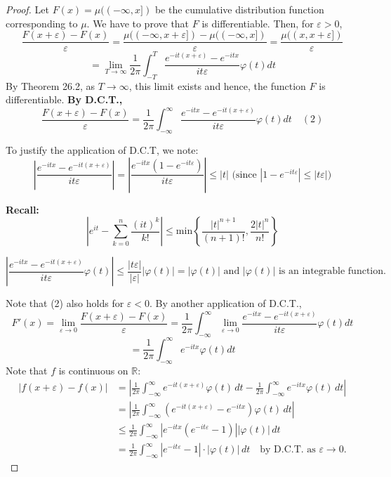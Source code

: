\begin{proof}
Let \( F(x) = \mu((-\infty, x]) \) be the cumulative distribution function corresponding to \(\mu\). We have to prove that \( F \) is differentiable. Then, for \( \varepsilon > 0 \),
\[
\frac{F(x+\varepsilon) - F(x)}{\varepsilon} = \frac{\mu((-\infty, x+\varepsilon]) - \mu((-\infty, x])}{\varepsilon} = \frac{\mu((x, x+\varepsilon])}{\varepsilon}
\]
\[
= \lim_{T \to \infty} \frac{1}{2\pi} \int_{-T}^{T} \frac{e^{-it(x+\varepsilon)} - e^{-itx}}{it\varepsilon} \varphi(t) dt
\]
By Theorem 26.2, as \( T \to \infty \), this limit exists and hence, the function \( F \) is differentiable.
\textbf{By D.C.T.,}
\begin{equation}
\frac{F(x+\varepsilon) - F(x)}{\varepsilon} = \frac{1}{2\pi} \int_{-\infty}^{\infty} \frac{e^{-itx} - e^{-it(x+\varepsilon)}}{it\varepsilon} \varphi(t) dt \quad (2)
\end{equation}

To justify the application of D.C.T, we note:
\[
\left| \frac{e^{-itx} - e^{-it(x+\varepsilon)}}{it\varepsilon} \right| = \left| \frac{e^{-itx}(1 - e^{-it\varepsilon})}{it\varepsilon} \right| \leq |t| \text{ (since } |1 - e^{-it\varepsilon}| \leq |t\varepsilon| \text{)}
\]

\textbf{Recall:}
\[
\left| e^{it} - \sum_{k=0}^{n} \frac{(it)^k}{k!} \right| \leq \text{min} \left\{ \frac{|t|^{n+1}}{(n+1)!}, \frac{2|t|^{n}}{n!} \right\}
\]

\[
\left| \frac{e^{-itx} - e^{-it(x+\varepsilon)}}{it\varepsilon} \varphi(t) \right| \leq \frac{|t\varepsilon|}{|\varepsilon|} |\varphi(t)| = |\varphi(t)| \text{ and } |\varphi(t)| \text{ is an integrable function.}
\]

Note that (2) also holds for $\varepsilon < 0$. By another application of D.C.T.,
\[
F'(x) = \lim_{\varepsilon \to 0} \frac{F(x+\varepsilon) - F(x)}{\varepsilon} = \frac{1}{2\pi} \int_{-\infty}^{\infty} \lim_{\varepsilon \to 0} \frac{e^{-itx} - e^{-it(x+\varepsilon)}}{it\varepsilon} \varphi(t) dt
\]
\[
= \frac{1}{2\pi} \int_{-\infty}^{\infty} e^{-itx} \varphi(t) dt
\]
Note that $f$ is continuous on $\mathbb{R}$:
\begin{align*}
|f(x+\varepsilon) - f(x)| &= \left| \frac{1}{2\pi} \int_{-\infty}^{\infty} e^{-it(x+\varepsilon)} \varphi(t) \, dt - \frac{1}{2\pi} \int_{-\infty}^{\infty} e^{-itx} \varphi(t) \, dt \right| \\
&= \left| \frac{1}{2\pi} \int_{-\infty}^{\infty} (e^{-it(x+\varepsilon)} - e^{-itx}) \varphi(t) \, dt \right| \\
&\leq \frac{1}{2\pi} \int_{-\infty}^{\infty} |e^{-itx} (e^{-it\varepsilon} - 1)| |\varphi(t)| \, dt \\
&= \frac{1}{2\pi} \int_{-\infty}^{\infty} |e^{-it\varepsilon} - 1| \cdot |\varphi(t)| \, dt \quad \text{by D.C.T. as } \varepsilon \to 0.
\end{align*}
\end{proof}

